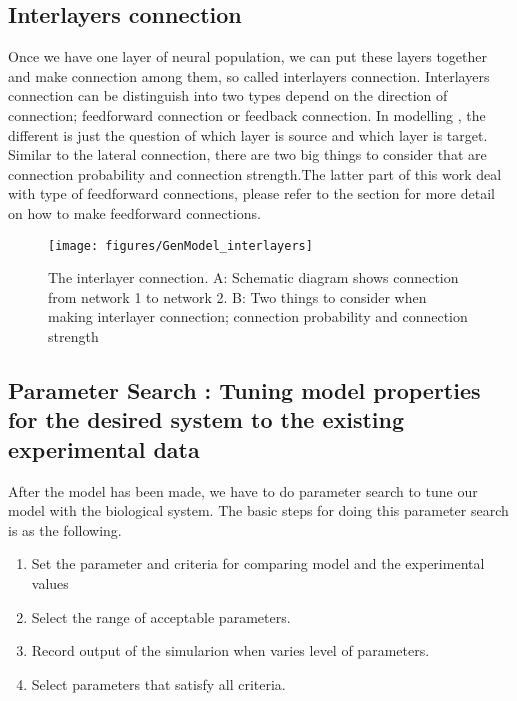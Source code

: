 \subsection{Interlayers connection}
Once we have one layer of neural population,  we can put these layers together and make connection among them, so called interlayers connection.
Interlayers connection can be distinguish into two types depend on the direction of connection; feedforward connection or feedback connection. In modelling , the different is just the question of which layer is source and which layer is target. Similar to the lateral connection, there are two big things to consider that are connection probability and connection strength.The latter part of this work deal with type of feedforward connections,  please refer to the section for more detail on how to make feedforward connections.
\begin{figure}
	\centering
	\texttt{[image: figures/GenModel\_interlayers]}
	\caption{The interlayer connection. A: Schematic diagram shows connection from network 1 to network 2. B: Two things to consider when making interlayer connection; connection probability and connection strength}
	\label{fig:GM_interlayer}
\end{figure}

\subsection{Parameter Search : Tuning model properties for the desired system to the existing experimental data}

After the model has been made, we have to do parameter search to tune our model with the biological system. The basic steps for doing this parameter search is as the following. 

\begin{enumerate}
 \item Set the parameter and criteria for comparing model and the experimental values
 \item Select the range of acceptable parameters.
 \item Record output of the simularion when varies level  of parameters.
 \item Select parameters that satisfy all criteria.
 \end{enumerate}
 
